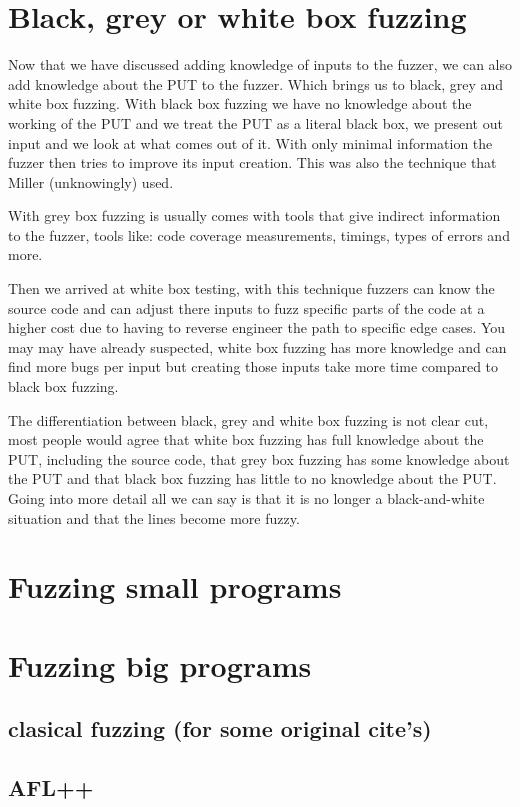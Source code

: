 \section{Black, grey or white box fuzzing}
Now that we have discussed adding knowledge of inputs to the fuzzer, we can also add knowledge about the PUT to the fuzzer. Which brings us to black, grey and white box fuzzing. With black box fuzzing we have no knowledge about the working of the PUT and we treat the PUT as a literal black box, we present out input and we look at what comes out of it. With only minimal information the fuzzer then tries to improve its input creation. This was also the technique that Miller (unknowingly) used.
 
With grey box fuzzing is usually comes with tools that give indirect information to the fuzzer, tools like: code coverage measurements, timings, types of errors and more.

Then we arrived at white box testing, with this technique fuzzers can know the source code and can adjust there inputs to fuzz specific parts of the code at a higher cost due to having to reverse engineer the path to specific edge cases. You may may have already suspected, white box fuzzing has more knowledge and can find more bugs per input but creating those inputs take more time compared to black box fuzzing.

The differentiation between black, grey and white box fuzzing is not clear cut, most people would agree that white box fuzzing has full knowledge about the PUT, including the source code, that grey box fuzzing has some knowledge about the PUT and that black box fuzzing has little to no knowledge about the PUT. Going into more detail all we can say is that it is no longer a black-and-white situation and that the lines become more fuzzy. 


\section{Fuzzing small programs} 
\section{Fuzzing big programs}

\subsection{clasical fuzzing (for some original cite's)}
\subsection{AFL++}
